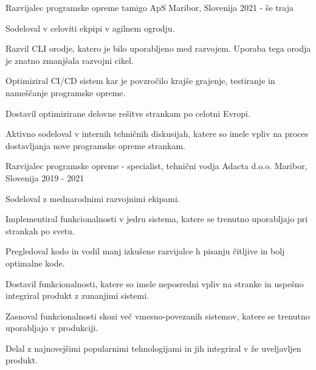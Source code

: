 

\begin{cventries}

  \cventry
    {Razvijalec programske opreme} %
    {tamigo ApS} %
    {Maribor, Slovenija} %
    {2021 - še traja} %
    {
      \begin{cvitems}          
        \item {Sodeloval v celoviti ekpipi v agilnem ogrodju.}
        \item {Razvil CLI orodje, katero je bilo uporabljeno med razvojem. 
        Uporaba tega orodja je znatno zmanjšala razvojni cikel.}
        \item {Optimiziral CI/CD sistem kar je povzročilo krajše grajenje, 
        testiranje in nameščanje programske opreme.}
        \item {Dostavil optimizirane delovne rešitve strankam po celotni Evropi.}
        \item {Aktivno sodeloval v internih tehničnih diskusijah, 
        katere so imele vpliv na proces dostavljanja nove programske opreme strankam.}
      \end{cvitems}
    }

  \cventry
    {Razvijalec programske opreme - specialist, tehnični vodja} %
    {Adacta d.o.o.} %
    {Maribor, Slovenija} %
    {2019 - 2021} %
    {
      \begin{cvitems}          
        \item {Sodeloval z mednarodnimi razvojnimi ekipami.}
        \item {Implementiral funkcionalnosti v jedru sistema, 
        katere se trenutno uporabljajo pri strankah po svetu.}
        \item {Pregledoval kodo in vodil manj izkušene razvijalce 
        h pisanju čitljive in bolj optimalne kode.}
        \item {Dostavil funkcionalnosti, katere so imele neposredni 
        vpliv na stranke in uspešno integriral produkt z zunanjimi sistemi.}
        \item {Zasnoval funkcionalnosti skozi več vmesno-povezanih sistemov,
         katere se trenutno uporabljajo v produkciji.}
        \item {Delal z najnovejšimi popularnimi tehnologijami in jih integriral 
        v že uveljavljen produkt.}
      \end{cvitems}
    }


\end{cventries}
